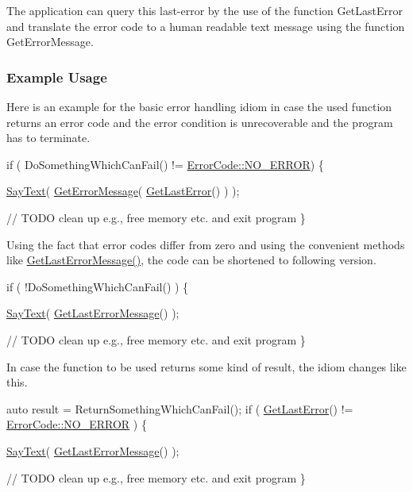 The application can query this last-\/error by the use of the function {\ttfamily Get\+Last\+Error} and translate the error code to a human readable text message using the function {\ttfamily Get\+Error\+Message}.\hypertarget{group__error__group_usage_sect}{}\subsubsection{Example Usage}\label{group__error__group_usage_sect}
Here is an example for the basic error handling idiom in case the used function returns an error code and the error condition is unrecoverable and the program has to terminate.


\begin{DoxyCode}
\textcolor{keywordflow}{if} ( DoSomethingWhichCanFail() != \hyperlink{group__error__group_gga59e56af19e754a6aa26a612ebf91d05fabf350750d0d4fabd8954c0f1e9bbae94}{ErrorCode::NO\_ERROR}) \{

  \hyperlink{group__io__group_ga82cdf45375c3b92b2a60c3d9b55d682f}{SayText}( \hyperlink{group__error__group_gac785e42215658e0f7127f3690dd8f788}{GetErrorMessage}( \hyperlink{group__error__group_ga10b9a284527af83a44533867b0aff0fc}{GetLastError}() ) );

  \textcolor{comment}{// TODO clean up e.g., free memory etc. and exit program}
\}
\end{DoxyCode}


Using the fact that error codes differ from zero and using the convenient methods like {\ttfamily \hyperlink{group__error__group_gac9be83c8ac2a5d80a2be46487c596eab}{Get\+Last\+Error\+Message()}}, the code can be shortened to following version.


\begin{DoxyCode}
\textcolor{keywordflow}{if} ( !DoSomethingWhichCanFail() ) \{

  \hyperlink{group__io__group_ga82cdf45375c3b92b2a60c3d9b55d682f}{SayText}( \hyperlink{group__error__group_gac9be83c8ac2a5d80a2be46487c596eab}{GetLastErrorMessage}() );

  \textcolor{comment}{// TODO clean up e.g., free memory etc. and exit program}
\}
\end{DoxyCode}


In case the function to be used returns some kind of result, the idiom changes like this.


\begin{DoxyCode}
\textcolor{keyword}{auto} result = ReturnSomethingWhichCanFail();
\textcolor{keywordflow}{if} ( \hyperlink{group__error__group_ga10b9a284527af83a44533867b0aff0fc}{GetLastError}() != \hyperlink{group__error__group_gga59e56af19e754a6aa26a612ebf91d05fabf350750d0d4fabd8954c0f1e9bbae94}{ErrorCode::NO\_ERROR} ) \{

  \hyperlink{group__io__group_ga82cdf45375c3b92b2a60c3d9b55d682f}{SayText}( \hyperlink{group__error__group_gac9be83c8ac2a5d80a2be46487c596eab}{GetLastErrorMessage}() );

  \textcolor{comment}{// TODO clean up e.g., free memory etc. and exit program}
\}
\end{DoxyCode}


